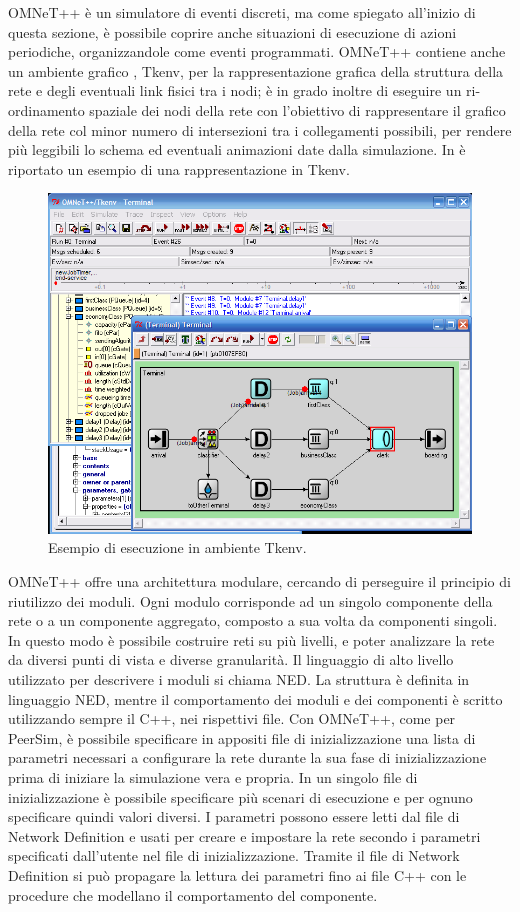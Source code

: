 OMNeT++ è un simulatore di eventi discreti, ma come spiegato all'inizio di questa sezione, è possibile coprire anche situazioni di esecuzione di azioni periodiche, organizzandole come eventi programmati. OMNeT++ contiene anche un ambiente grafico \cite{omnet2002-overview}, Tkenv, per la rappresentazione grafica della struttura della rete e degli eventuali link fisici tra i nodi; è in grado inoltre di eseguire un ri-ordinamento spaziale dei nodi della rete con l'obiettivo di rappresentare il grafico della rete col minor numero di intersezioni tra i collegamenti possibili, per rendere più leggibili lo schema ed eventuali animazioni date dalla simulazione. In  è riportato un esempio di una rappresentazione in Tkenv.
\begin{figure}[tb]
	\centering
	\includegraphics[width=0.7\linewidth]{Images/omnet/tkenv_01}
	\caption[Ambiente Tkenv]{Esempio di esecuzione in ambiente Tkenv.}
	\label{fig:tkenv_01}
\end{figure}
OMNeT++ offre una architettura modulare, cercando di perseguire il principio di riutilizzo dei moduli\cite{omnet2002-overview}. Ogni modulo corrisponde ad un singolo componente della rete o a un componente aggregato, composto a sua volta da componenti singoli. In questo modo è possibile costruire reti su più livelli, e poter analizzare la rete da diversi punti di vista e diverse granularità. Il linguaggio di alto livello utilizzato per descrivere i moduli si chiama \acf{NED}. La struttura è definita in linguaggio \acs{NED}, mentre il comportamento dei moduli e dei componenti è scritto utilizzando sempre il C++, nei rispettivi file. 
Con OMNeT++, come per PeerSim,  è possibile specificare in appositi file di inizializzazione una lista di parametri necessari a configurare la rete durante la sua fase di inizializzazione prima di iniziare la simulazione vera e propria.  In un singolo file di inizializzazione è possibile specificare più scenari di esecuzione e per ognuno specificare quindi valori diversi. I parametri possono essere letti dal file di Network Definition e usati per creare e impostare la rete secondo i parametri specificati dall'utente nel file di inizializzazione. Tramite il file di Network Definition si può propagare la lettura dei parametri fino ai file C++ con le procedure che modellano il comportamento del componente.
